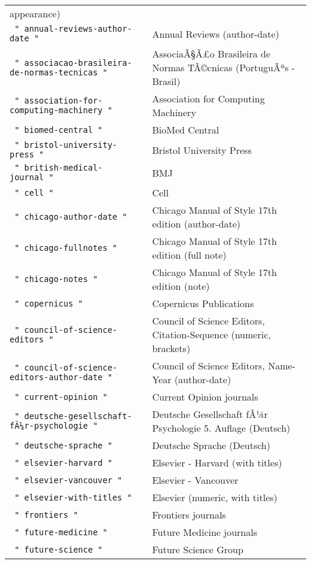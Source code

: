 \begin{longtable}[]{@{}ll@{}}
appearance) \\
\texttt{\ "\ annual-reviews-author-date\ "\ } & Annual Reviews
(author-date) \\
\texttt{\ "\ associacao-brasileira-de-normas-tecnicas\ "\ } &
AssociaÃ§Ã£o Brasileira de Normas TÃ©cnicas (PortuguÃªs - Brasil) \\
\texttt{\ "\ association-for-computing-machinery\ "\ } & Association for
Computing Machinery \\
\texttt{\ "\ biomed-central\ "\ } & BioMed Central \\
\texttt{\ "\ bristol-university-press\ "\ } & Bristol University
Press \\
\texttt{\ "\ british-medical-journal\ "\ } & BMJ \\
\texttt{\ "\ cell\ "\ } & Cell \\
\texttt{\ "\ chicago-author-date\ "\ } & Chicago Manual of Style 17th
edition (author-date) \\
\texttt{\ "\ chicago-fullnotes\ "\ } & Chicago Manual of Style 17th
edition (full note) \\
\texttt{\ "\ chicago-notes\ "\ } & Chicago Manual of Style 17th edition
(note) \\
\texttt{\ "\ copernicus\ "\ } & Copernicus Publications \\
\texttt{\ "\ council-of-science-editors\ "\ } & Council of Science
Editors, Citation-Sequence (numeric, brackets) \\
\texttt{\ "\ council-of-science-editors-author-date\ "\ } & Council of
Science Editors, Name-Year (author-date) \\
\texttt{\ "\ current-opinion\ "\ } & Current Opinion journals \\
\texttt{\ "\ deutsche-gesellschaft-fÃ¼r-psychologie\ "\ } & Deutsche
Gesellschaft fÃ¼r Psychologie 5. Auflage (Deutsch) \\
\texttt{\ "\ deutsche-sprache\ "\ } & Deutsche Sprache (Deutsch) \\
\texttt{\ "\ elsevier-harvard\ "\ } & Elsevier - Harvard (with
titles) \\
\texttt{\ "\ elsevier-vancouver\ "\ } & Elsevier - Vancouver \\
\texttt{\ "\ elsevier-with-titles\ "\ } & Elsevier (numeric, with
titles) \\
\texttt{\ "\ frontiers\ "\ } & Frontiers journals \\
\texttt{\ "\ future-medicine\ "\ } & Future Medicine journals \\
\texttt{\ "\ future-science\ "\ } & Future Science Group \\

\end{longtable}
